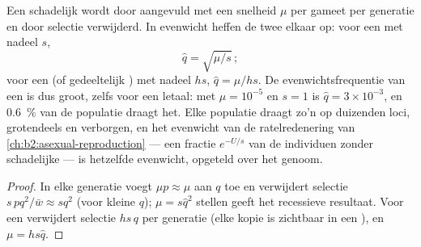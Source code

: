 \begin{theorem}\label{thm:b2:population-genetics:balance}
Een schadelijk  wordt door  aangevuld met een snelheid $\mu$ per
gameet per generatie en door selectie verwijderd. In evenwicht heffen de twee
elkaar op: voor een   met  nadeel $s$,
\[
\hat q = \sqrt{\mu/s}\,;
\]
voor een  (of gedeeltelijk )  met 
nadeel $hs$, $\hat q = \mu/hs$. De evenwichtsfrequentie van een 
 is dus groot, zelfs voor een letaal: met $\mu = 10^{-5}$ en
$s = 1$ is $\hat q = 3\times 10^{-3}$, en \qty{0.6}{\%} van de populatie
draagt het. Elke populatie draagt zo'n \emph{} op
duizenden loci, grotendeels  en verborgen, en het evenwicht van de
ratelredenering van \cref{ch:b2:asexual-reproduction}
--- een fractie $e^{-U/s}$ van de individuen zonder schadelijke
 --- is hetzelfde evenwicht, opgeteld over het genoom.
\end{theorem}
\begin{proof}
In elke generatie voegt  $\mu p \approx \mu$ aan $q$ toe en
verwijdert selectie $s\,pq^{2}/\bar w \approx sq^{2}$ (voor kleine $q$);
$\mu = s\hat q^{2}$ stellen geeft het recessieve resultaat. Voor een
  verwijdert selectie $hs\,q$ per generatie (elke kopie
is zichtbaar in een ), en $\mu = hs\hat q$.
\end{proof}

